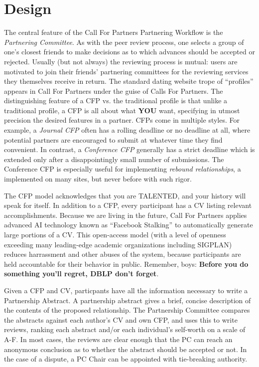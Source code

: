 \documentclass{article}
\begin{document}
\section{Design}
The central feature of the Call For Partners Partnering Workflow is the \emph{Partnering Committee}.
As with the peer review process, one selects a group of one's closest friends to make decisions as to which advances should be accepted or rejected.
Usually (but not always) the reviewing process is mutual: users are motivated to join their friends' partnering committees for the reviewing services they themselves receive in return. The standard dating website trope of ``profiles'' appears in Call For Partners under the guise of Calls For Partners.
The distinguishing feature of a CFP vs. the traditional profile is that unlike a traditional profile, a CFP is all about what \textbf{YOU} want, specifying in utmost precision the desired features in a partner. CFPs come in multiple styles. For example, a \emph{Journal CFP} often has a rolling deadline or no deadline at all, where potential partners are encouraged to submit at whatever time they find convenient. In contrast, a \emph{Conference CFP} generally has a strict deadline which is extended only after a disappointingly small number of submissions. The Conference CFP is especially useful for implementing \emph{rebound relationships}, a implemented on many sites, but never before with such rigor.

The CFP model acknowledges that you are TALENTED, and your history will speak for itself. In addition to a CFP, every participant has a CV listing relevant accomplishments. Because we are living in the future, Call For Partners applies advanced AI technology known as ``Facebook Stalking'' to automatically generate large portions of a CV. This open-access model (with a level of openness exceeding many leading-edge academic organizations including SIGPLAN) reduces harrassment and other abuses of the system, because participants are held accountable for their behavior in public. Remember, boys: \textbf{Before you do something you'll regret, DBLP don't forget}.

Given a CFP and CV, particpants have all the information necessary to write a Partnership Abstract.
A partnership abstract gives a brief, concise description of the contents of the proposed relationship.
The Partnership Committee compares the abstracts against each author's CV and own CFP, and uses this to write reviews, ranking each abstract and/or each individual's self-worth on a scale of A-F.
In most cases, the reviews are clear enough that the PC can reach an anonymous conclusion as to whether the abstract should be accepted or not.
In the case of a dispute, a PC Chair can be appointed with tie-breaking authority.
\end{document}
